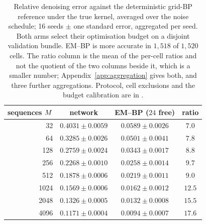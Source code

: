 
\begin{table}[!htbp]
\caption{Relative denoising error against the deterministic grid-BP reference under the true
kernel, averaged over the noise schedule; 16 seeds $\pm$ one standard error, aggregated
per seed. Both arms select their optimisation budget on a disjoint validation bundle. EM--BP is
more accurate in $1{,}518$ of $1{,}520$ cells. The ratio column is the mean of
the per-cell ratios and not the quotient of the two columns beside it, which is a smaller number;
Appendix~\ref{app:aggregation} gives both, and three further aggregations. Protocol, cell exclusions
and the budget calibration are in \provenanceappendix.}
\label{tab:pointwise}
\centering
\begin{tabular}{rccc}
\toprule
sequences $M$ & network & EM--BP ($24$ free) & ratio \\
\midrule
32   & $0.4031 \pm 0.0059$ & $\mathbf{0.0589 \pm 0.0026}$ & $7.0$ \\
64   & $0.3285 \pm 0.0026$ & $\mathbf{0.0501 \pm 0.0041}$ & $7.8$ \\
128  & $0.2759 \pm 0.0024$ & $\mathbf{0.0343 \pm 0.0017}$ & $8.8$ \\
256  & $0.2268 \pm 0.0010$ & $\mathbf{0.0258 \pm 0.0014}$ & $9.7$ \\
512  & $0.1878 \pm 0.0006$ & $\mathbf{0.0219 \pm 0.0011}$ & $9.0$ \\
1024 & $0.1569 \pm 0.0006$ & $\mathbf{0.0162 \pm 0.0012}$ & $12.5$ \\
2048 & $0.1326 \pm 0.0005$ & $\mathbf{0.0132 \pm 0.0008}$ & $15.5$ \\
4096 & $0.1171 \pm 0.0004$ & $\mathbf{0.0094 \pm 0.0007}$ & $17.6$ \\
\bottomrule
\end{tabular}
\end{table}
